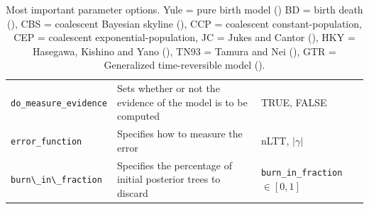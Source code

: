 \begin{table}
\begin{tabular}{|p{3.2cm}|p{9.7cm}|p{4.5cm}@{}|}
    \verb;do_measure_evidence; &
    Sets whether or not the evidence of the model is to be computed &
    TRUE, FALSE \\
    \verb;error_function; &
    Specifies how to measure the error &
    nLTT, $|\gamma|$ \\
    \verb;burn\_in\_fraction; &
    Specifies the percentage of initial posterior trees to discard &
    \verb;burn_in_fraction; $\in [0, 1]$\\
    \hline
  \end{tabular}
  \caption{
    Most important parameter options.
    Yule = pure birth model (\cite{yule})
    BD = birth death (\cite{nee1994reconstructed}), 
    CBS = coalescent Bayesian skyline (\cite{drummond2005bayesian}), 
    CCP = coalescent constant-population, 
    CEP = coalescent exponential-population,
    JC = Jukes and Cantor (\cite{jukes1969evolution}), 
    HKY = Hasegawa, Kishino and Yano (\cite{hasegawa1985dating}), 
    TN93 = Tamura and Nei (\cite{tamura1993estimation}), 
    GTR = Generalized time-reversible model (\cite{tavare1986some}).
  }
  \label{tab:options}
\bigskip


\end{table}
